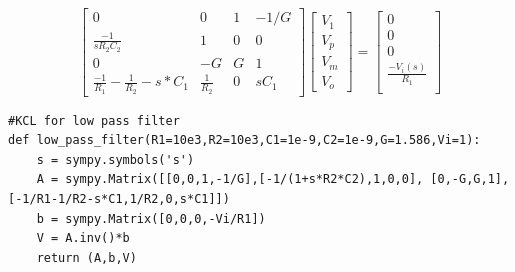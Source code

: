 \documentclass[11pt, a4paper]{article}
\begin{document}
\begin{equation*}
    \begin{bmatrix}
    0   & 0 & 1  & -1/G \\
    \frac{-1}{sR_2C_2}  & 1 & 0 & 0\\
    0  & -G & G & 1 \\
    \frac{-1}{R_1} - \frac{1}{R_2} - s*C_1 & \frac{1}{R_2} & 0 & sC_1
\end{bmatrix}
\begin{bmatrix}
    V_1\\
    V_p\\
    V_m \\
    V_o
\end{bmatrix}
=
\begin{bmatrix}
    0 \\
    0 \\
    0 \\
    \frac{-V_i(s)}{R_1} \\
\end{bmatrix}
\end{equation*}

\begin{lstlisting}
#KCL for low pass filter
def low_pass_filter(R1=10e3,R2=10e3,C1=1e-9,C2=1e-9,G=1.586,Vi=1):
	s = sympy.symbols('s')
	A = sympy.Matrix([[0,0,1,-1/G],[-1/(1+s*R2*C2),1,0,0], [0,-G,G,1],[-1/R1-1/R2-s*C1,1/R2,0,s*C1]])
	b = sympy.Matrix([0,0,0,-Vi/R1])
	V = A.inv()*b
	return (A,b,V)
\end{lstlisting}
\end{document}
